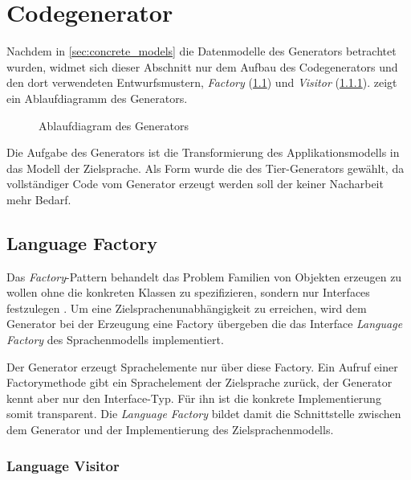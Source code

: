 \section{Codegenerator}
\label{sec:codegenerator}

Nachdem in \cref{sec:concrete_models} die Datenmodelle des Generators betrachtet wurden, widmet sich dieser Abschnitt nur dem Aufbau des Codegenerators und den dort verwendeten Entwurfsmustern, \emph{Factory} (\cref{sec:language_factory}) und \emph{Visitor} (\cref{sec:language_visitor}).  zeigt ein Ablaufdiagramm des Generators.

\begin{sidewaysfigure}
    \centering
    \resizebox{ \textwidth}{!}{
        
    } 
    \caption{Ablaufdiagram des Generators}
    \label{fig:generation_process}
\end{sidewaysfigure}

Die Aufgabe des Generators ist die Transformierung des Applikationsmodells in das Modell der Zielsprache. Als Form wurde die des Tier-Generators gewählt, da vollständiger Code vom Generator erzeugt werden soll der keiner Nacharbeit mehr Bedarf. 

\subsection{Language Factory}
\label{sec:language_factory}

Das \emph{Factory}-Pattern behandelt das Problem Familien von Objekten erzeugen zu wollen ohne die konkreten Klassen zu spezifizieren, sondern nur Interfaces festzulegen \cite[][S. 26]{patternsKompakt}.
Um eine Zielsprachenunabhängigkeit zu erreichen, wird dem Generator bei der Erzeugung eine Factory übergeben die das Interface \emph{Language Factory} des Sprachenmodells implementiert. 

Der Generator erzeugt Sprachelemente nur über diese Factory. Ein Aufruf einer Factorymethode gibt ein Sprachelement der Zielsprache zurück, der Generator kennt aber nur den Interface-Typ. Für ihn ist die konkrete Implementierung somit transparent. 
Die \emph{Language Factory} bildet damit die Schnittstelle zwischen dem Generator und der Implementierung des Zielsprachenmodells.

\subsubsection{Language Visitor}
\label{sec:language_visitor}

